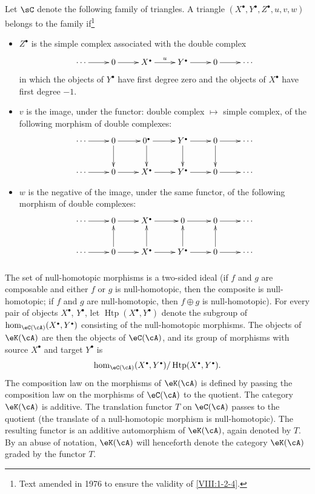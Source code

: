Let $\sC$ denote the following family of triangles. A triangle
$(X^\bullet,Y^\bullet,Z^\bullet,u,v,w)$ belongs to the family
if\footnote{Text amended in 1976 to ensure the validity of
\ref{VIII:1-2-4}.}
\begin{itemize}
  \item $Z^\bullet$ is the simple complex associated with the double
    complex
    \[\xymatrix{
      \cdots \ar[r]
        & 0 \ar[r]
        & X^\bullet \ar[r]^-u
        & Y^\bullet \ar[r]
        & 0 \ar[r]
        & \cdots
    }\]
    in which the objects of $Y^\bullet$ have first degree zero and the
    objects of $X^\bullet$ have first degree $-1$.
  \item $v$ is the image, under the functor: double complex $\mapsto$
    simple complex, of the following morphism of double complexes:
    \[\xymatrix{
      \cdots \ar[r]
        & 0 \ar[r] \ar[d]
        & 0^\bullet \ar[r] \ar[d]
        & Y^\bullet \ar[r] \ar[d]
        & 0 \ar[r] \ar[d]
        & \cdots \\
      \cdots \ar[r]
        & 0 \ar[r]
        & X^\bullet \ar[r]
        & Y^\bullet \ar[r]
        & 0 \ar[r]
        & \cdots
    }\]
  \item $w$ is the negative of the image, under the same functor, of the
    following morphism of double complexes:
    \[\xymatrix{
      \cdots \ar[r]
        & 0 \ar[r]
        & X^\bullet \ar[r]
        & 0 \ar[r]
        & 0 \ar[r]
        & \cdots \\
      \cdots  \ar[r]
        & 0 \ar[r] \ar[u]
        & X^\bullet \ar[r] \ar[u]
        & Y^\bullet \ar[r] \ar[u]
        & 0 \ar[r] \ar[u]
        & \cdots
    }\]
\end{itemize}

\subsubsection{}\label{VIII:1-2-2}

The set of null-homotopic morphisms is a two-sided ideal (if $f$ and $g$
are composable and either $f$ or $g$ is null-homotopic, then the composite
is null-homotopic; if $f$ and $g$ are null-homotopic, then
$f\oplus g$ is null-homotopic). For every pair of objects $X^\bullet$,
$Y^\bullet$, let $\operatorname{Htp}(X^\bullet,Y^\bullet)$ denote the
subgroup of $\hom_{\eC(\cA)}(X^\bullet,Y^\bullet)$ consisting of the
null-homotopic morphisms. The objects of $\eK(\cA)$ are then the objects
of $\eC(\cA)$, and its group of morphisms with source $X^\bullet$ and
target $Y^\bullet$ is
\[
  \hom_{\eC(\cA)}(X^\bullet,Y^\bullet) / \operatorname{Htp}(X^\bullet,Y^\bullet) \text{.}
\]
The composition law on the morphisms of $\eK(\cA)$ is defined by passing
the composition law on the morphisms of $\eC(\cA)$ to the quotient.
The category $\eK(\cA)$ is additive. The translation functor $T$ on
$\eC(\cA)$ passes to the quotient (the translate of a null-homotopic
morphism is null-homotopic). The resulting functor is an additive
automorphism of $\eK(\cA)$, again denoted by $T$. By an abuse of notation,
$\eK(\cA)$ will henceforth denote the category $\eK(\cA)$ graded by the
functor $T$.

